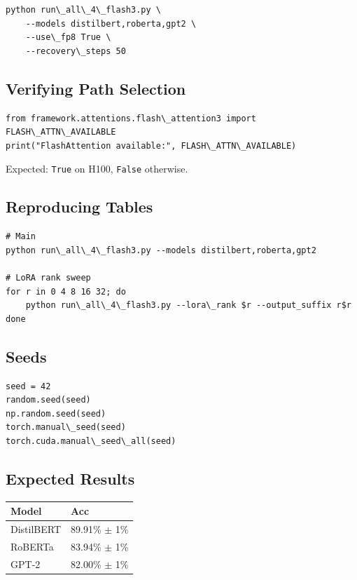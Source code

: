 \begin{lstlisting}
python run\_all\_4\_flash3.py \
    --models distilbert,roberta,gpt2 \
    --use\_fp8 True \
    --recovery\_steps 50
\end{lstlisting}

\subsection{Verifying Path Selection}

\begin{lstlisting}
from framework.attentions.flash\_attention3 import FLASH\_ATTN\_AVAILABLE
print("FlashAttention available:", FLASH\_ATTN\_AVAILABLE)
\end{lstlisting}

Expected: \texttt{True} on H100, \texttt{False} otherwise.

\subsection{Reproducing Tables}

\begin{lstlisting}
# Main
python run\_all\_4\_flash3.py --models distilbert,roberta,gpt2

# LoRA rank sweep
for r in 0 4 8 16 32; do
    python run\_all\_4\_flash3.py --lora\_rank $r --output_suffix r$r
done
\end{lstlisting}

\subsection{Seeds}

\begin{lstlisting}
seed = 42
random.seed(seed)
np.random.seed(seed)
torch.manual\_seed(seed)
torch.cuda.manual\_seed\_all(seed)
\end{lstlisting}

\subsection{Expected Results}

\begin{table}[H]
\centering
\small
\begin{tabular}{ll}
\toprule
\textbf{Model} & \textbf{Acc} \\
\midrule
DistilBERT & 89.91\% $\pm$ 1\% \\
RoBERTa & 83.94\% $\pm$ 1\% \\
GPT-2 & 82.00\% $\pm$ 1\% \\
\bottomrule
\end{tabular}
\end{table}

